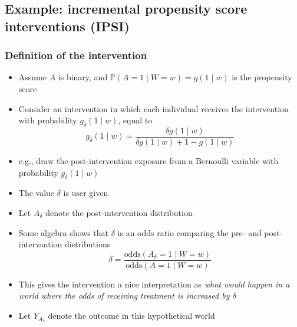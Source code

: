 \documentclass[
  12pt,
]{book}
\providecommand{\tightlist}{%
  \setlength{\itemsep}{0pt}\setlength{\parskip}{0pt}}
\theoremstyle{definition}
\theoremstyle{definition}
\theoremstyle{definition}
\renewcommand{\P}{\mathbb{P}}
\newcommand{\1}{\mathbbm{1}}
\begin{document}
\hypertarget{example-incremental-propensity-score-interventions-ipsi-kennedy2018nonparametric}{%
\subsection*{\texorpdfstring{Example: incremental propensity score interventions (IPSI) \citep{kennedy2018nonparametric}}{Example: incremental propensity score interventions (IPSI) {[}@kennedy2018nonparametric{]}}}\label{example-incremental-propensity-score-interventions-ipsi-kennedy2018nonparametric}}


\hypertarget{definition-of-the-intervention}{%
\subsubsection*{Definition of the intervention}\label{definition-of-the-intervention}}


\begin{itemize}
\tightlist
\item
  Assume \(A\) is binary, and \(\P(A=1\mid W=w) = g(1\mid w)\) is the propensity score
\item
  Consider an intervention in which each individual receives the intervention
  with probability \(g_\delta(1\mid w)\), equal to
  \begin{equation*}
    g_\delta(1\mid w)=\frac{\delta g(1\mid w)}{\delta g(1\mid w) +
    1 - g(1\mid w)}
  \end{equation*}
\item
  e.g., draw the post-intervention exposure from a Bernoulli variable with
  probability \(g_\delta(1\mid w)\)
\item
  The value \(\delta\) is user given
\item
  Let \(A_\delta\) denote the post-intervention distribution
\item
  Some algebra shows that \(\delta\) is an odds ratio comparing the pre- and
  post-intervantion distributions
  \begin{equation*}
    \delta = \frac{\text{odds}(A_\delta = 1\mid W=w)}
    {\text{odds}(A = 1\mid W=w)}
  \end{equation*}
\item
  This gives the intervention a nice interpretation as \emph{what would happen in a
  world where the odds of receiving treatment is increased by \(\delta\)}
\item
  Let \(Y_{A_\delta}\) denote the outcome in this hypothetical world
\end{itemize}
\end{document}
